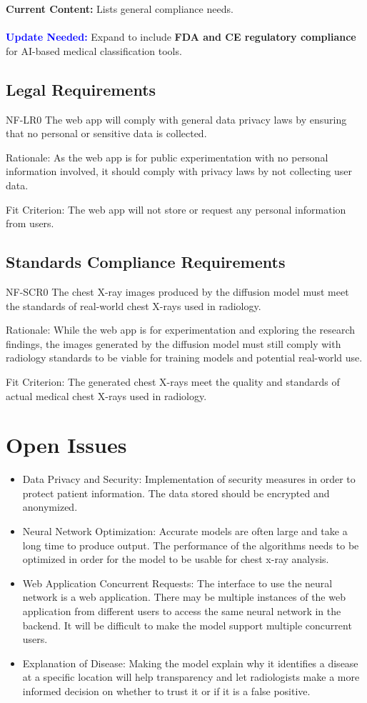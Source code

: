 \documentclass[12pt]{article}
\begin{document}
\textbf{Current Content:} Lists general compliance needs. \\
\\
\textbf{\textcolor{blue}{Update Needed:}} Expand to include \textbf{FDA and CE regulatory compliance} for AI-based medical classification tools.

\subsection{Legal Requirements}
NF-LR0 The web app will comply with general data privacy laws by ensuring that no personal or 
sensitive data is collected.

Rationale: As the web app is for public experimentation with no personal information involved, it 
should comply with privacy laws by not collecting user data.

Fit Criterion: The web app will not store or request any personal information from users.

\subsection{Standards Compliance Requirements}
NF-SCR0 The chest X-ray images produced by the diffusion model must meet the standards of 
real-world chest X-rays used in radiology.

Rationale: While the web app is for experimentation and exploring the research findings, the 
images generated by the diffusion model must still comply with radiology standards to be viable 
for training models and potential real-world use.

Fit Criterion: The generated chest X-rays meet the quality and standards of actual medical chest 
X-rays used in radiology.

\section{Open Issues}
\begin{itemize}
    \item Data Privacy and Security: Implementation of security measures in order to protect 
    patient information. The data stored should be encrypted and anonymized.
    \item Neural Network Optimization: Accurate models are often large and take a long time to 
    produce output. The performance of the algorithms needs to be optimized in order for the model 
    to be usable for chest x-ray analysis.
    \item Web Application Concurrent Requests: The interface to use the neural network is a web 
    application. There may be multiple instances of the web application from different users to 
    access the same neural network in the backend. It will be difficult to make the model support 
    multiple concurrent users.
    \item Explanation of Disease: Making the model explain why it identifies a disease at a 
    specific location will help transparency and let radiologists make a more informed decision on 
    whether to trust it or if it is a false positive.
\end{itemize}
\end{document}
